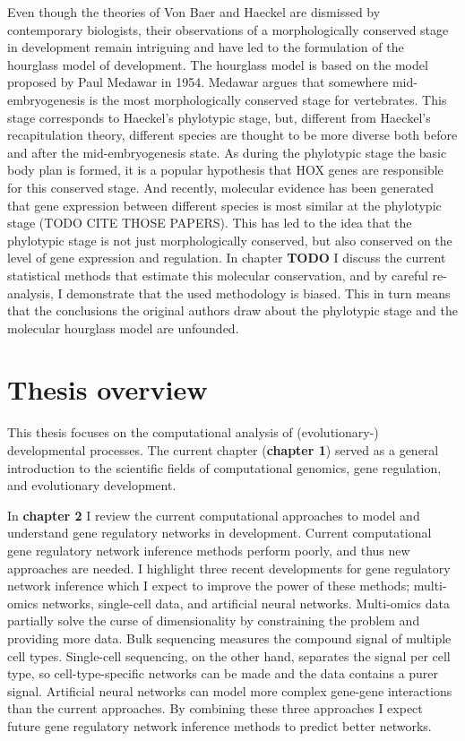 Even though the theories of Von Baer and Haeckel are dismissed by contemporary biologists, their observations of a morphologically conserved stage in development remain intriguing and have led to the formulation of the hourglass model of development. The hourglass model is based on the model proposed by Paul Medawar in 1954\cite{Medawar1954}. Medawar argues that somewhere mid-embryogenesis is the most morphologically conserved stage for vertebrates. This stage corresponds to Haeckel's phylotypic stage, but, different from Haeckel's recapitulation theory, different species are thought to be more diverse both before and after the mid-embryogenesis state. As during the phylotypic stage the basic body plan is formed, it is a popular hypothesis that HOX genes are responsible for this conserved stage. And recently, molecular evidence has been generated that gene expression between different species is most similar at the phylotypic stage (TODO CITE THOSE PAPERS). This has led to the idea that the phylotypic stage is not just morphologically conserved, but also conserved on the level of gene expression and regulation. In chapter \textbf{TODO} I discuss the current statistical methods that estimate this molecular conservation, and by careful re-analysis, I demonstrate that the used methodology is biased. This in turn means that the conclusions the original authors draw about the phylotypic stage and the molecular hourglass model are unfounded. 

\section{Thesis overview}

This thesis focuses on the computational analysis of (evolutionary-) developmental processes. The current chapter (\textbf{chapter 1}) served as a general introduction to the scientific fields of computational genomics, gene regulation, and evolutionary development.  

In \textbf{chapter 2} I review the current computational approaches to model and understand gene regulatory networks in development. Current computational gene regulatory network inference methods perform poorly, and thus new approaches are needed. I highlight three recent developments for gene regulatory network inference which I expect to improve the power of these methods; multi-omics networks, single-cell data, and artificial neural networks. Multi-omics data partially solve the curse of dimensionality by constraining the problem and providing more data. Bulk sequencing measures the compound signal of multiple cell types. Single-cell sequencing, on the other hand, separates the signal per cell type, so cell-type-specific networks can be made and the data contains a purer signal. Artificial neural networks can model more complex gene-gene interactions than the current approaches. By combining these three approaches I expect future gene regulatory network inference methods to predict better networks.

